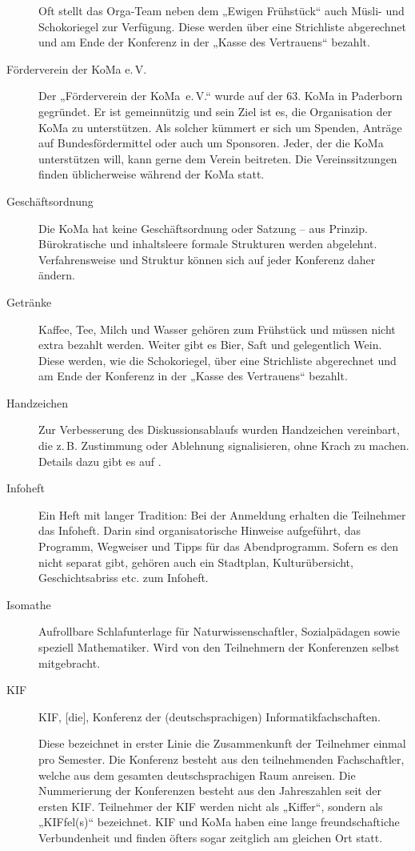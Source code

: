 \begin{description}
	Oft stellt das Orga-Team neben dem „Ewigen Frühstück“ auch Müsli- und
	Schokoriegel zur Verfügung. Diese werden über eine Strichliste abgerechnet
	und am Ende der Konferenz in der „Kasse des Vertrauens“ bezahlt.

\item[Förderverein der KoMa e.\,V.] Der „Förderverein der KoMa~e.\,V.“ wurde
	auf der 63. KoMa in Paderborn gegründet. Er ist gemeinnützig und sein Ziel
	ist es, die Organisation der KoMa zu unterstützen. Als solcher kümmert er
	sich um Spenden, Anträge auf Bundesfördermittel oder auch um Sponsoren.
	Jeder, der die KoMa unterstützen will, kann gerne dem Verein beitreten. Die
	Vereinssitzungen finden üblicherweise während der KoMa statt.

\item[Geschäftsordnung] Die KoMa hat keine Geschäftsordnung oder Satzung – aus
	Prinzip. Bürokratische und inhaltsleere formale Strukturen werden
	abgelehnt. Verfahrensweise und Struktur können sich auf jeder Konferenz
	daher ändern.

\item[Getränke] Kaffee, Tee, Milch und Wasser gehören zum Frühstück und müssen
	nicht extra bezahlt werden. Weiter gibt es Bier, Saft und gelegentlich
	Wein. Diese werden, wie die Schokoriegel, über eine Strichliste abgerechnet
	und am Ende der Konferenz in der „Kasse des Vertrauens“ bezahlt.

\item[Handzeichen] Zur Verbesserung des Diskussionsablaufs wurden Handzeichen
	vereinbart, die z.\,B. Zustimmung oder Ablehnung signalisieren, ohne Krach
	zu machen. Details dazu gibt es auf .

\item[Infoheft] Ein Heft mit langer Tradition: Bei der Anmeldung erhalten die
	Teilnehmer das Infoheft. Darin sind organisatorische Hinweise aufgeführt,
	das Programm, Wegweiser und Tipps für das Abendprogramm. Sofern es den
	nicht separat gibt, gehören auch ein Stadtplan, Kulturübersicht,
	Geschichtsabriss etc. zum Infoheft.

\item[Isomathe] Aufrollbare Schlafunterlage für Naturwissenschaftler,
	Sozialpädagen sowie speziell Mathematiker. Wird von den Teilnehmern der
	Konferenzen selbst mitgebracht.

\item[KIF] KIF, [die], Konferenz der (deutschsprachigen)
	Informatikfachschaften.

	Diese bezeichnet in erster Linie die Zusammenkunft der Teilnehmer einmal
	pro Semester. Die Konferenz besteht aus den teilnehmenden Fachschaftler,
	welche aus dem gesamten deutschsprachigen Raum anreisen. Die Nummerierung
	der Konferenzen besteht aus den Jahreszahlen seit der ersten KIF.\@
	Teilnehmer der KIF werden nicht als „Kiffer“, sondern als „KIFfel(s)“
	bezeichnet. KIF und KoMa haben eine lange freundschaftiche Verbundenheit
	und finden öfters sogar zeitglich am gleichen Ort statt.


\end{description}
